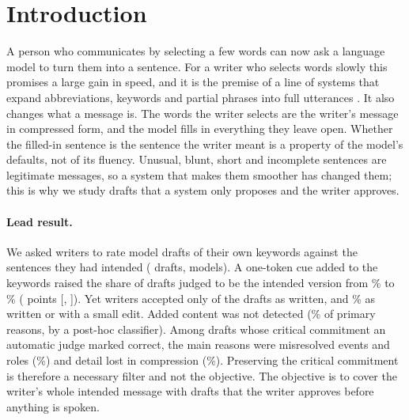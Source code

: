 
\section{Introduction}\label{sec:intro}

A person who communicates by selecting a few words can now ask a language model to turn them into a sentence. For a writer who selects words slowly this promises a large gain in speed, and it is the premise of a line of systems that expand abbreviations, keywords and partial phrases into full utterances \cite{shen2022kwickchat,cai2022abbrev,cai2024speakfaster}. It also changes what a message is. The words the writer selects are the writer's message in compressed form, and the model fills in everything they leave open. Whether the filled-in sentence is the sentence the writer meant is a property of the model's defaults, not of its fluency. Unusual, blunt, short and incomplete sentences are legitimate messages, so a system that makes them smoother has changed them; this is why we study drafts that a system only proposes and the writer approves.

\paragraph{Lead result.}
We asked \jmpOneEightWriters{} writers to rate model drafts of their own keywords against the sentences they had intended (\jmpOneEightAcceptN{} drafts, \jmwmModels{} models). A one-token cue added to the keywords raised the share of drafts judged to be the intended version from \jmpOneEightMatchBare{}\% to \jmpOneEightMatchChip{}\% (\jmpOneEightCueGain{} points [\jmpOneEightCueGainLo{}, \jmpOneEightCueGainHi{}]). Yet writers accepted only \jmpOneEightAcceptYesK{} of the \jmpOneEightAcceptN{} drafts as written, and \jmpOneEightAcceptYesSmall{}\% as written or with a small edit. Added content was not detected (\jmwmAdded{}\% of primary reasons, by a post-hoc classifier). Among drafts whose critical commitment an automatic judge marked correct, the main reasons were misresolved events and roles (\jmwmRightSubst{}\%) and detail lost in compression (\jmwmRightDropped{}\%). Preserving the critical commitment is therefore a necessary filter and not the objective. The objective is to cover the writer's whole intended message with drafts that the writer approves before anything is spoken.

